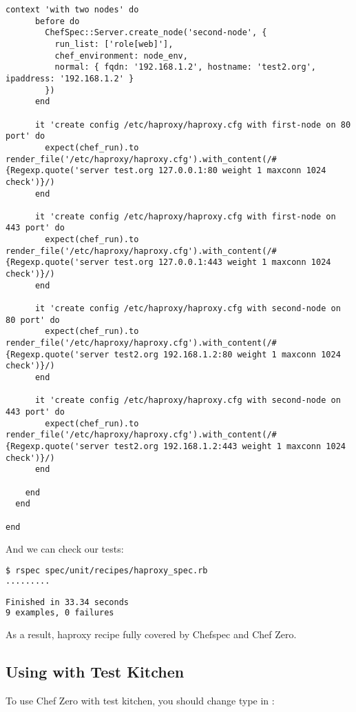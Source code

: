 \begin{lstlisting}[label=lst:testing-chef-zero15]
    context 'with two nodes' do
      before do
        ChefSpec::Server.create_node('second-node', {
          run_list: ['role[web]'],
          chef_environment: node_env,
          normal: { fqdn: '192.168.1.2', hostname: 'test2.org', ipaddress: '192.168.1.2' }
        })
      end

      it 'create config /etc/haproxy/haproxy.cfg with first-node on 80 port' do
        expect(chef_run).to render_file('/etc/haproxy/haproxy.cfg').with_content(/#{Regexp.quote('server test.org 127.0.0.1:80 weight 1 maxconn 1024 check')}/)
      end

      it 'create config /etc/haproxy/haproxy.cfg with first-node on 443 port' do
        expect(chef_run).to render_file('/etc/haproxy/haproxy.cfg').with_content(/#{Regexp.quote('server test.org 127.0.0.1:443 weight 1 maxconn 1024 check')}/)
      end

      it 'create config /etc/haproxy/haproxy.cfg with second-node on 80 port' do
        expect(chef_run).to render_file('/etc/haproxy/haproxy.cfg').with_content(/#{Regexp.quote('server test2.org 192.168.1.2:80 weight 1 maxconn 1024 check')}/)
      end

      it 'create config /etc/haproxy/haproxy.cfg with second-node on 443 port' do
        expect(chef_run).to render_file('/etc/haproxy/haproxy.cfg').with_content(/#{Regexp.quote('server test2.org 192.168.1.2:443 weight 1 maxconn 1024 check')}/)
      end

    end
  end

end
\end{lstlisting}

And we can check our tests:

\begin{lstlisting}[language=Bash,label=lst:testing-chef-zero16]
$ rspec spec/unit/recipes/haproxy_spec.rb
.........

Finished in 33.34 seconds
9 examples, 0 failures
\end{lstlisting}

As a result, haproxy recipe fully covered by Chefspec and Chef Zero.

\subsection{Using with Test Kitchen}

To use Chef Zero with test kitchen, you should change  type in :

